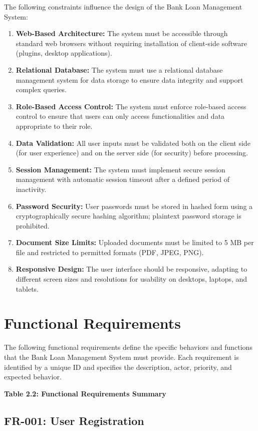 \documentclass[12pt,a4paper,oneside]{report}
\begin{document}
The following constraints influence the design of the Bank Loan Management System:

\begin{enumerate}
  \item \textbf{Web-Based Architecture:} The system must be accessible through standard web browsers without requiring installation of client-side software (plugins, desktop applications).
  \item \textbf{Relational Database:} The system must use a relational database management system for data storage to ensure data integrity and support complex queries.
  \item \textbf{Role-Based Access Control:} The system must enforce role-based access control to ensure that users can only access functionalities and data appropriate to their role.
  \item \textbf{Data Validation:} All user inputs must be validated both on the client side (for user experience) and on the server side (for security) before processing.
  \item \textbf{Session Management:} The system must implement secure session management with automatic session timeout after a defined period of inactivity.
  \item \textbf{Password Security:} User passwords must be stored in hashed form using a cryptographically secure hashing algorithm; plaintext password storage is prohibited.
  \item \textbf{Document Size Limits:} Uploaded documents must be limited to 5 MB per file and restricted to permitted formats (PDF, JPEG, PNG).
  \item \textbf{Responsive Design:} The user interface should be responsive, adapting to different screen sizes and resolutions for usability on desktops, laptops, and tablets.
\end{enumerate}

\section{Functional Requirements}

The following functional requirements define the specific behaviors and functions that the Bank Loan Management System must provide. Each requirement is identified by a unique ID and specifies the description, actor, priority, and expected behavior.

\textbf{Table 2.2: Functional Requirements Summary}

\subsection{FR-001: User Registration}
\end{document}
